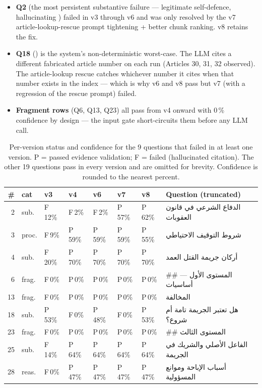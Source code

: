 \documentclass[final,1p,times]{elsarticle}
\newcommand{\thead}[1]{\textbf{#1}}                 %
\newcommand{\ar}[1]{{\arabicfont\beginR #1\endR}}
\begin{document}
\begin{itemize}
  \item \textbf{Q2} (the most persistent substantive failure --- legitimate
        self-defence, hallucinating \protect\ar{المادة 87}) failed in v3
        through v6 and was only resolved by the v7 article-lookup-rescue
        prompt tightening + better chunk ranking. v8 retains the fix.
  \item \textbf{Q18} (\protect\ar{الجريمة تامة أم شروع}) is the system's
        non-deterministic worst-case. The LLM cites a different fabricated
        article number on each run (Articles 30, 31, 32 observed). The
        article-lookup rescue catches whichever number it cites when that
        number exists in the index --- which is why v6 and v8 pass but v7
        (with a regression of the rescue prompt) failed.
  \item \textbf{Fragment rows} (Q6, Q13, Q23) all pass from v4 onward with
        0\,\% confidence by design --- the input gate short-circuits them
        before any LLM call.
\end{itemize}

\begin{table}[!htb]
\centering
\small
\caption{Per-version status and confidence for the 9 questions that failed
in at least one version. P = passed evidence validation; F = failed
(hallucinated citation). The other 19 questions pass in every version and
are omitted for brevity. Confidence is rounded to the nearest percent.}
\label{tab:transition}
\setlength{\tabcolsep}{3.5pt}
\renewcommand{\arraystretch}{1.18}
\begin{tabular}{rllllllp{4.8cm}}
\toprule
\rowcolor{tabhead}
\thead{\#} & \thead{cat} & \thead{v3} & \thead{v4} & \thead{v6} & \thead{v7} & \thead{v8} & \thead{Question (truncated)} \\
\midrule
 2 & sub.  & F\,12\% & F\,2\%  & F\,2\%  & P\,57\% & P\,62\% & \ar{الدفاع الشرعي في قانون العقوبات} \\
 3 & proc. & F\,9\%  & P\,59\% & P\,59\% & P\,59\% & P\,55\% & \ar{شروط التوقيف الاحتياطي} \\
 4 & sub.  & F\,20\% & P\,70\% & P\,70\% & P\,70\% & P\,70\% & \ar{أركان جريمة القتل العمد} \\
 6 & frag. & F\,0\%  & P\,0\%  & P\,0\%  & P\,0\%  & P\,0\%  & \ar{\#\# المستوى الأول --- أساسيات} \\
13 & frag. & F\,0\%  & P\,0\%  & P\,0\%  & P\,0\%  & P\,0\%  & \ar{* المخالفة} \\
18 & sub.  & P\,53\% & F\,0\%  & P\,48\% & F\,0\%  & P\,53\% & \ar{هل تعتبر الجريمة تامة أم شروع؟} \\
23 & frag. & F\,0\%  & P\,0\%  & P\,0\%  & P\,0\%  & P\,0\%  & \ar{\#\# المستوى الثالث} \\
25 & sub.  & F\,14\% & P\,64\% & P\,64\% & P\,64\% & P\,64\% & \ar{الفاعل الأصلي والشريك في الجريمة} \\
28 & reas. & F\,0\%  & P\,47\% & P\,47\% & P\,47\% & P\,47\% & \ar{أسباب الإباحة وموانع المسؤولية} \\
\bottomrule
\end{tabular}
\end{table}
\end{document}
